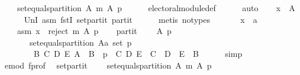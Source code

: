 \begin{isabellebody}
\ \ \ \ {\isachardoublequoteopen}set{\isacharunderscore}{\kern0pt}equals{\isacharunderscore}{\kern0pt}partition\ A\ {\isacharparenleft}{\kern0pt}m\ A\ p{\isacharparenright}{\kern0pt}{\isachardoublequoteclose}\isanewline
\ \ \ \ \isamarkupfalse%
\ electoral{\isacharunderscore}{\kern0pt}module{\isacharunderscore}{\kern0pt}def\isanewline
\ \ \ \ \isamarkupfalse%
\ auto\isanewline
\ \ \isamarkupfalse%
\ {\isachardoublequoteopen}x\ {\isasymin}\ A{\isachardoublequoteclose}\isanewline
\ \ \ \ \isamarkupfalse%
\ UnI{}\ asm\ fstI\ set{\isacharunderscore}{\kern0pt}partit\ partit\isanewline
\ \ \ \ \isamarkupfalse%
\ {\isacharparenleft}{\kern0pt}metis\ {\isacharparenleft}{\kern0pt}no{\isacharunderscore}{\kern0pt}types{\isacharparenright}{\kern0pt}{\isacharparenright}{\kern0pt}\isanewline
{}\isamarkupfalse%
\isanewline
\ \ \isamarkupfalse%
\isanewline
\ \ \ \ x\ {\isacharcolon}{\kern0pt}{\isacharcolon}{\kern0pt}\ {\isachardoublequoteopen}{\isacharprime}{\kern0pt}a{\isachardoublequoteclose}\isanewline
\ \ \isamarkupfalse%
\isanewline
\ \ \ \ asm{\isacharcolon}{\kern0pt}\ {\isachardoublequoteopen}x\ {\isasymin}\ reject\ m\ A\ p{\isachardoublequoteclose}\isanewline
\ \ \isamarkupfalse%
\ partit{\isacharcolon}{\kern0pt}\isanewline
\ \ \ \ {\isachardoublequoteopen}{\isasymforall}A\ p{\isachardot}{\kern0pt}\isanewline
\ \ \ \ \ \ {\isasymnot}\ set{\isacharunderscore}{\kern0pt}equals{\isacharunderscore}{\kern0pt}partition\ {\isacharparenleft}{\kern0pt}A{\isacharcolon}{\kern0pt}{\isacharcolon}{\kern0pt}{\isacharprime}{\kern0pt}a\ set{\isacharparenright}{\kern0pt}\ p\ {\isasymor}\isanewline
\ \ \ \ \ \ \ \ {\isacharparenleft}{\kern0pt}{\isasymexists}B\ C\ D\ E{\isachardot}{\kern0pt}\ A\ {\isacharequal}{\kern0pt}\ B\ {\isasymand}\ p\ {\isacharequal}{\kern0pt}\ {\isacharparenleft}{\kern0pt}C{\isacharcomma}{\kern0pt}\ D{\isacharcomma}{\kern0pt}\ E{\isacharparenright}{\kern0pt}\ {\isasymand}\ C\ {\isasymunion}\ D\ {\isasymunion}\ E\ {\isacharequal}{\kern0pt}\ B{\isacharparenright}{\kern0pt}{\isachardoublequoteclose}\isanewline
\ \ \ \ \isamarkupfalse%
\ simp\isanewline
\ \ \isamarkupfalse%
\ e{\isacharunderscore}{\kern0pt}mod\ f{\isacharunderscore}{\kern0pt}prof\ \isamarkupfalse%
\ set{\isacharunderscore}{\kern0pt}partit{\isacharcolon}{\kern0pt}\isanewline
\ \ \ \ {\isachardoublequoteopen}set{\isacharunderscore}{\kern0pt}equals{\isacharunderscore}{\kern0pt}partition\ A\ {\isacharparenleft}{\kern0pt}m\ A\ p{\isacharparenright}{\kern0pt}{\isachardoublequoteclose}\isanewline

\end{isabellebody}
